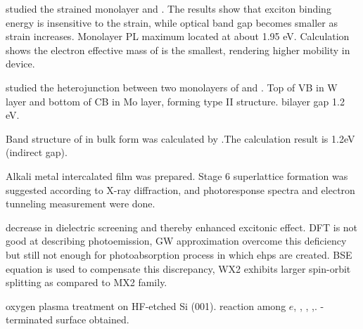\citeauthor{Shi2013} studied the strained monolayer  and . The results show that exciton binding energy is insensitive to the strain, while optical band gap becomes smaller as strain increases. Monolayer  PL maximum located at about 1.95 eV. Calculation shows the electron effective mass of  is the smallest, rendering higher mobility in device.\cite{Shi2013}

\citeauthor{Kosmider2013} studied the heterojunction between two monolayers of  and . Top of VB in W layer and bottom of CB in Mo layer, forming type II structure. bilayer gap 1.2 eV.\cite{Kosmider2013}

Band structure  of  in bulk form was calculated by \citeauthor{Mattheiss1973}.The calculation result is 1.2eV (indirect gap).\cite{Mattheiss1973}

Alkali metal intercalated  film was prepared.\cite{Homyonfer1997} Stage 6 superlattice formation was suggested according to X-ray diffraction, and photoresponse spectra and electron tunneling measurement were done.

decrease in dielectric screening and thereby enhanced excitonic effect.
DFT is not good at describing photoemission, GW approximation overcome this deficiency but still not enough for photoabsorption process in which ehps are created. BSE equation is used to compensate this discrepancy, WX2 exhibits larger spin-orbit splitting as compared to MX2 family.\cite{Ramasubramaniam2012}

oxygen plasma treatment on HF-etched Si (001). reaction among $e$, , , ,. -terminated surface obtained.\cite{Habib2010}